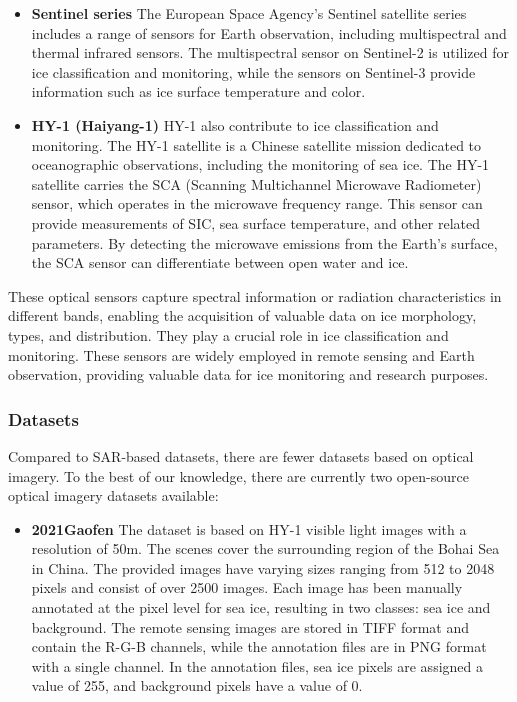 \begin{itemize}
\item \textbf{Sentinel series} The European Space Agency's Sentinel satellite series includes a range of sensors for Earth observation, including multispectral and thermal infrared sensors. The multispectral sensor on Sentinel-2 is utilized for ice classification and monitoring, while the sensors on Sentinel-3 provide information such as ice surface temperature and color.
\end{itemize}

\begin{itemize}
\item \textbf{HY-1 (Haiyang-1)} HY-1 also contribute to ice classification and monitoring. The HY-1 satellite is a Chinese satellite mission dedicated to oceanographic observations, including the monitoring of sea ice. The HY-1 satellite carries the SCA (Scanning Multichannel Microwave Radiometer) sensor, which operates in the microwave frequency range. This sensor can provide measurements of SIC, sea surface temperature, and other related parameters. By detecting the microwave emissions from the Earth's surface, the SCA sensor can differentiate between open water and ice.

\end{itemize}

These optical sensors capture spectral information or radiation characteristics in different bands, enabling the acquisition of valuable data on ice morphology, types, and distribution. They play a crucial role in ice classification and monitoring. These sensors are widely employed in remote sensing and Earth observation, providing valuable data for ice monitoring and research purposes.   


\subsubsection {Datasets}

Compared to SAR-based datasets, there are fewer datasets based on optical imagery. To the best of our knowledge, there are currently two open-source optical imagery datasets available:

\begin{itemize}
\item \textbf{2021Gaofen} The dataset is based on HY-1 visible light images with a resolution of 50m. The scenes cover the surrounding region of the Bohai Sea in China. The provided images have varying sizes ranging from 512 to 2048 pixels and consist of over 2500 images. Each image has been manually annotated at the pixel level for sea ice, resulting in two classes: sea ice and background. The remote sensing images are stored in TIFF format and contain the R-G-B channels, while the annotation files are in PNG format with a single channel. In the annotation files, sea ice pixels are assigned a value of 255, and background pixels have a value of 0.
\end{itemize}

